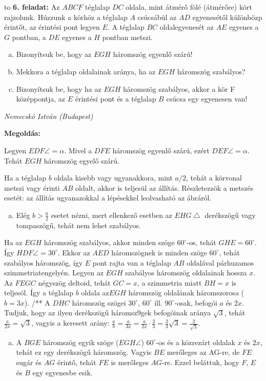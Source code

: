 \documentclass[a4paper,10pt]{article}
\def\ki#1#2{\hfill {\it #1 (#2)}\medskip}
\begin{document}
\hbox to 
{\bf 6. feladat: } 
Az $ABCF$ téglalap $DC$ oldala, mint átmérő fölé (átmérőre) kört rajzolunk. Húzzunk a körhöz a téglalap $A$ csúcsábül az $AD$ egyenesétől különbözp érintőt, az érintési pont legyen $E$. A téglalap $BC$ oldalegyenesét az $AE$ egyenes a $G$ pontban, a $DE$ egyenes a $H$ pontban metszi.

\begin{enumerate} [a)]
    \item Bizonyítsuk be, hogy az $EGH$ háromszög egyenlő szárú!
    \item Mekkora a téglalap oldalainak aránya, ha az $EGH$ háromszög szabályos?
    \item Bizonyítsuk be, hogy ha az $EGH$ háromszög szabályos, akkor a kör F középpontja, az $E$ érintési pont és a téglalap $B$ csúcsa egy egyenesen van!
\end{enumerate}

\ki{Nemecskó István}{Budapest}\medskip

{\bf Megoldás: }
\begin{enumerate} [a)]
    {\item 
        Legyen $EDF\angle=\alpha$. Mivel a $DFE$ háromszög egyenlő szárú, ezért $DEF\angle=\alpha$. Tehát $EGH$ háromszög egyelő szárú.
    }
\end{enumerate}
Ha a téglalap $b$ oldala kisebb vagy ugyanakkora, mint $a/2$, tehát a körvonal metszi vagy érinti $AB$ oldalt, akkor is teljesül az állítás. Részletezzök a metszés esetét: az állítás ugyanazokkal a lépésekkel leolvasható az ábráról.
\begin{enumerate} [b)]
    \item Elég $b>\frac{a}{2}$ esetet nézni, mert ellenkező esetben az $EHG\bigtriangleup$ derékszögű vagy tompaszögű, tehát nem lehet szabályos.
\end{enumerate}
Ha az $EGH$ háromszög szabályos, akkor minden szöge $60^\circ$-os, tehát $GHE=60^\circ$. Így $HDF\angle=30^\circ$. Ekkor az $AED$ háromszögnek is minden szöge $60^\circ$, tehát szabályos háromszög, így $E$ pont rajta van a téglalap $AB$ oldalával párhuzamos szimmetriatengelyén. Legyen az $EGH$ szabályos háromszög oldalainak hossza $x$. Az $FEGC$ négyszög deltoid, tehát $GC=x$, a szimmetria miatt $BH=x$ is teljesól. Így a téglalap $b$ oldala az$EGH$ háromszög oldalának háromszorosa ($b=3x$). /**
A $DHC$ háromszög szögei $30^\circ$, $60^\circ$ ill. $90^\circ$-osak, befogói $a$ és $2x$. Tudjuk, hogy az ilyen derékszögű háromsz9gek befogóinak aránya $\sqrt{3}$, tehát $\frac{a}{2x}=\sqrt{3}$, vagyis a keresett arány: $\frac{a}{b}=\frac{a}{3x}=\frac{a}{2x}\cdot\frac23=\frac23 \sqrt{3}=\frac{2}{\sqrt{3}}$.

\begin{enumerate} [c)]
\item A $BGE$ háromszög egyik szöge ($EGH\angle$) $60^\circ$-os és a közrezárt oldalak $x$ és $2x$, tehát ez egy derékszögű háromszög. Vagyis $BE$ merőleges az AG-re, de $FE$ sugár és $AG$ érintő, tehát $FE$ is merőleges $AG$-re. Ezzel beláttuk, hogy $F$, $E$ és $B$ egy egyenesbe esik.
\end{enumerate}
\end{document}
